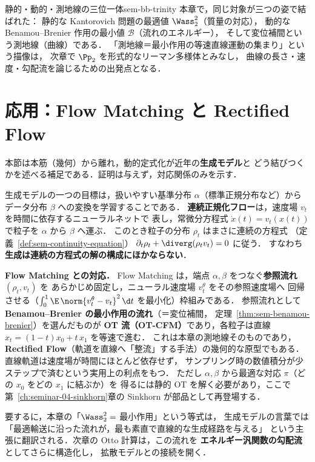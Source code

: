 \begin{remark}{静的・動的・測地線の三位一体}{sem-bb-trinity}
  本章で，同じ対象が三つの姿で結ばれた：
  静的な Kantorovich 問題の最適値 $\Wass_2^2$（質量の対応），
  動的な Benamou--Brenier 作用の最小値 $\mathcal{B}$（流れのエネルギー），
  そして変位補間という測地線（曲線）である．
  「測地線＝最小作用の等速直線運動の集まり」という描像は，
  次章で $\Pp_2$ を形式的なリーマン多様体とみなし，
  曲線の長さ・速度・勾配流を論じるための出発点となる．
\end{remark}

\section{応用：Flow Matching と Rectified Flow}
\label{sec:sem-bb-flow-matching}

本節は本筋（幾何）から離れ，動的定式化が近年の\textbf{生成モデル}と
どう結びつくかを述べる補足である．証明は与えず，対応関係のみを示す．

生成モデルの一つの目標は，扱いやすい基準分布 $\alpha$（標準正規分布など）から
データ分布 $\beta$ への変換を学習することである．
\textbf{連続正規化フロー}は，速度場 $v_t$ を時間に依存するニューラルネットで
表し，常微分方程式 $\dot x(t)=v_t(x(t))$ で粒子を $\alpha$ から $\beta$ へ運ぶ．
このとき粒子の分布 $\rho_t$ はまさに連続の方程式
（定義~\ref{def:sem-continuity-equation}）
$\partial_t\rho_t+\diverg(\rho_t v_t)=0$ に従う．
すなわち\textbf{生成は連続の方程式の解の構成にほかならない}．

\begin{memo*}
  \textbf{Flow Matching との対応．}
  Flow Matching は，端点 $\alpha,\beta$ をつなぐ\textbf{参照流れ} $(\rho_t,v_t)$ を
  あらかじめ固定し，ニューラル速度場 $v_t^\theta$ をその参照速度場へ
  回帰させる（$\int_0^1\E\,\norm{v_t^\theta-v_t}^2\,\d t$ を最小化）枠組みである．
  参照流れとして\textbf{ Benamou--Brenier の最小作用の流れ}（＝変位補間，
  定理~\ref{thm:sem-benamou-brenier}）を選んだものが
  \textbf{OT 流（OT-CFM）}であり，各粒子は直線
  $x_t=(1-t)x_0+t\,x_1$ を等速で進む．
  これは本章の測地線そのものであり，
  \textbf{Rectified Flow}（軌道を直線へ「整流」する手法）の幾何的な原型でもある．
  直線軌道は速度場が時間にほとんど依存せず，
  サンプリング時の数値積分が少ステップで済むという実用上の利点をもつ．
  ただし $\alpha,\beta$ から最適な対応 $\pi$（どの $x_0$ をどの $x_1$ に結ぶか）を
  得るには静的 OT を解く必要があり，ここで第~\ref{ch:seminar-04-sinkhorn}章の
  Sinkhorn が部品として再登場する．
\end{memo*}

要するに，本章の「$\Wass_2^2=$ 最小作用」という等式は，
生成モデルの言葉では「最適輸送に沿った流れが，最も素直で直線的な生成経路を与える」
という主張に翻訳される．次章の Otto 計算は，この流れを
\textbf{エネルギー汎関数の勾配流}としてさらに構造化し，
拡散モデルとの接続を開く．
